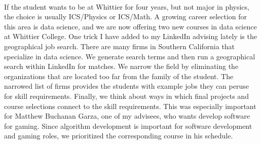 \documentclass[../../../main.tex]{subfiles}
\begin{document}
\\
\vspace{0.15cm}
If the student wants to be at Whittier for four years, but not major in physics, the choice is usually ICS/Physics or ICS/Math.  A growing career selection for this area is data science, and we are now offering two new courses in data science at Whittier College.  One trick I have added to my LinkedIn advising lately is the geographical job search.  There are many firms in Southern California that specialize in data science.  We generate search terms and then run a geographical search within LinkedIn for matches.  We narrow the field by eliminating the organizations that are located too far from the family of the student.  The narrowed list of firms provides the students with example jobs they can peruse for skill requirements.  Finally, we think about ways in which final projects and course selections connect to the skill requirements.  This was especially important for Matthew Buchanan Garza, one of my advisees, who wants develop software for gaming.  Since algorithm development is important for software development and gaming roles, we prioritized the corresponding course in his schedule.
\end{document}
